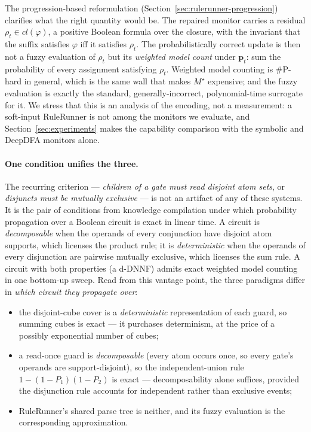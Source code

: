 The progression-based reformulation (Section~\ref{sec:rulerunner-progression}) clarifies what the right quantity would be. The repaired monitor carries a residual $\rho_t \in cl(\varphi)$, a positive Boolean formula over the closure, with the invariant that the suffix satisfies $\varphi$ iff it satisfies $\rho_t$. The probabilistically correct update is then not a fuzzy evaluation of $\rho_t$ but its \emph{weighted model count} under $\mathbf{p}_t$: sum the probability of every assignment satisfying $\rho_t$. Weighted model counting is $\#\mathrm{P}$-hard in general, which is the same wall that makes $M^\star$ expensive; and the fuzzy evaluation is exactly the standard, generally-incorrect, polynomial-time surrogate for it. We stress that this is an analysis of the encoding, not a measurement: a soft-input RuleRunner is not among the monitors we evaluate, and Section~\ref{sec:experiments} makes the capability comparison with the symbolic and DeepDFA monitors alone.

\paragraph{One condition unifies the three.} The recurring criterion --- \emph{children of a gate must read disjoint atom sets}, or \emph{disjuncts must be mutually exclusive} --- is not an artifact of any of these systems. It is the pair of conditions from knowledge compilation \cite{darwiche2002knowledge} under which probability propagation over a Boolean circuit is exact in linear time. A circuit is \emph{decomposable} when the operands of every conjunction have disjoint atom supports, which licenses the product rule; it is \emph{deterministic} when the operands of every disjunction are pairwise mutually exclusive, which licenses the sum rule. A circuit with both properties (a d-DNNF) admits exact weighted model counting in one bottom-up sweep. Read from this vantage point, the three paradigms differ in \emph{which circuit they propagate over}:

\begin{itemize}
  \item the disjoint-cube cover is a \emph{deterministic} representation of each guard, so summing cubes is exact --- it purchases determinism, at the price of a possibly exponential number of cubes;
  \item a read-once guard is \emph{decomposable} (every atom occurs once, so every gate's operands are support-disjoint), so the independent-union rule $1 - (1-P_1)(1-P_2)$ is exact --- decomposability alone suffices, provided the disjunction rule accounts for independent rather than exclusive events;
  \item RuleRunner's shared parse tree is neither, and its fuzzy evaluation is the corresponding approximation.
\end{itemize}

